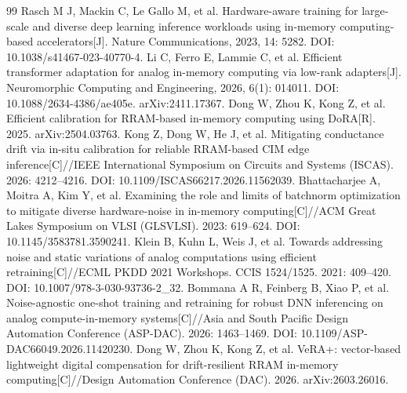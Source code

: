 \documentclass[11pt,a4paper]{ctexart}
\begin{document}
\begin{thebibliography}{99}
 Rasch M J, Mackin C, Le Gallo M, et al. Hardware-aware training for large-scale and diverse deep learning inference workloads using in-memory computing-based accelerators[J]. Nature Communications, 2023, 14: 5282. DOI: 10.1038/s41467-023-40770-4.
 Li C, Ferro E, Lammie C, et al. Efficient transformer adaptation for analog in-memory computing via low-rank adapters[J]. Neuromorphic Computing and Engineering, 2026, 6(1): 014011. DOI: 10.1088/2634-4386/ae405e. arXiv:2411.17367.
 Dong W, Zhou K, Kong Z, et al. Efficient calibration for RRAM-based in-memory computing using DoRA[R]. 2025. arXiv:2504.03763.
 Kong Z, Dong W, He J, et al. Mitigating conductance drift via in-situ calibration for reliable RRAM-based CIM edge inference[C]//IEEE International Symposium on Circuits and Systems (ISCAS). 2026: 4212--4216. DOI: 10.1109/ISCAS66217.2026.11562039.
 Bhattacharjee A, Moitra A, Kim Y, et al. Examining the role and limits of batchnorm optimization to mitigate diverse hardware-noise in in-memory computing[C]//ACM Great Lakes Symposium on VLSI (GLSVLSI). 2023: 619--624. DOI: 10.1145/3583781.3590241.
 Klein B, Kuhn L, Weis J, et al. Towards addressing noise and static variations of analog computations using efficient retraining[C]//ECML PKDD 2021 Workshops. CCIS 1524/1525. 2021: 409--420. DOI: 10.1007/978-3-030-93736-2\_32.
 Bommana A R, Feinberg B, Xiao P, et al. Noise-agnostic one-shot training and retraining for robust DNN inferencing on analog compute-in-memory systems[C]//Asia and South Pacific Design Automation Conference (ASP-DAC). 2026: 1463--1469. DOI: 10.1109/ASP-DAC66049.2026.11420230.
 Dong W, Zhou K, Kong Z, et al. VeRA+: vector-based lightweight digital compensation for drift-resilient RRAM in-memory computing[C]//Design Automation Conference (DAC). 2026. arXiv:2603.26016.
\end{thebibliography}
\end{document}
